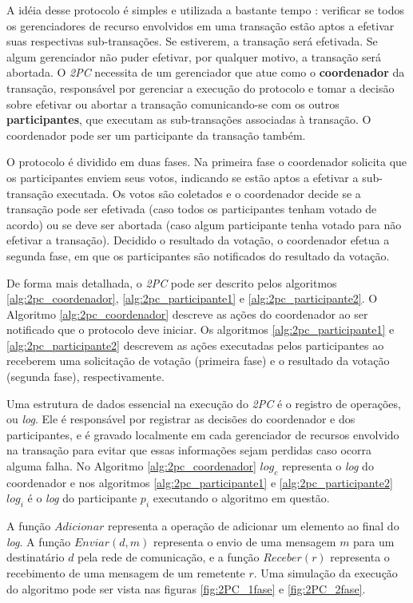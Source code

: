 \documentclass[11pt,twoside,a4paper]{book}
\begin{document}
A idéia desse protocolo é simples e utilizada a bastante tempo \cite{2pc}: verificar se todos os gerenciadores de recurso envolvidos em uma transação estão aptos a efetivar suas respectivas sub-transações. Se estiverem, a transação será efetivada. Se algum gerenciador não puder efetivar, por qualquer motivo, a transação será abortada. O \emph{2PC} necessita de um gerenciador que atue como o \textbf{coordenador} da transação, responsável por gerenciar a execução do protocolo e tomar a decisão sobre efetivar ou abortar a transação comunicando-se com os outros \textbf{participantes}, que executam as sub-transações associadas à transação. O coordenador pode ser um participante da transação também.

O protocolo é dividido em duas fases. Na primeira fase o coordenador solicita que os participantes enviem seus votos, indicando se estão aptos a efetivar a sub-transação executada. Os votos são coletados e o coordenador decide se a transação pode ser efetivada (caso todos os participantes tenham votado de acordo) ou se deve ser abortada (caso algum participante tenha votado para não efetivar a transação). Decidido o resultado da votação, o coordenador efetua a segunda fase, em que os participantes são notificados do resultado da votação. 

De forma mais detalhada, o \emph{2PC} pode ser descrito pelos algoritmos \ref{alg:2pc_coordenador}, \ref{alg:2pc_participante1} e  \ref{alg:2pc_participante2}. O Algoritmo \ref{alg:2pc_coordenador} descreve as ações do coordenador ao ser notificado que o protocolo deve  iniciar. Os algoritmos \ref{alg:2pc_participante1} e \ref{alg:2pc_participante2} descrevem as ações executadas pelos participantes ao receberem uma solicitação de votação (primeira fase) e o resultado da votação (segunda fase), respectivamente. 

Uma estrutura de dados essencial na execução do \emph{2PC} é o registro de operações, ou \emph{log}. Ele é responsável por registrar as decisões do coordenador e dos participantes, e é gravado localmente em cada gerenciador de recursos envolvido na transação para evitar que essas informações sejam perdidas caso ocorra alguma falha. No Algoritmo \ref{alg:2pc_coordenador} $log_c$ representa o \emph{log} do coordenador e nos algoritmos \ref{alg:2pc_participante1} e \ref{alg:2pc_participante2} $log_i$ é o \emph{log} do participante $p_i$ executando o algoritmo em questão.

A função $Adicionar$ representa a operação de adicionar um elemento ao final do \emph{log}. A função $Enviar(d, m)$ representa o envio de uma mensagem $m$ para um destinatário $d$ pela rede de comunicação, e a função $Receber(r)$ representa o recebimento de uma mensagem de um remetente $r$. Uma simulação da execução do algoritmo pode ser vista nas figuras \ref{fig:2PC_1fase} e \ref{fig:2PC_2fase}.
\end{document}
